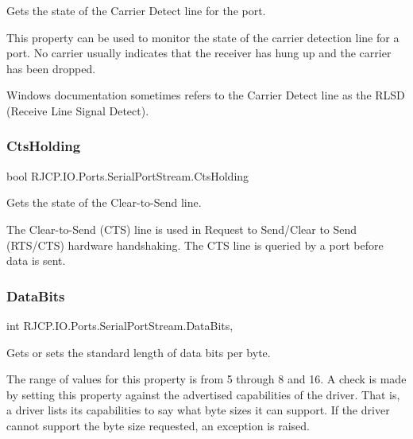Gets the state of the Carrier Detect line for the port. 

This property can be used to monitor the state of the carrier detection line for a port. No carrier usually indicates that the receiver has hung up and the carrier has been dropped. 

Windows documentation sometimes refers to the Carrier Detect line as the R\+L\+SD (Receive Line Signal Detect).\mbox{\label{class_r_j_c_p_1_1_i_o_1_1_ports_1_1_serial_port_stream_a63d7e47b92d9e4d2635c19f7025c8609}} 
\subsubsection{\texorpdfstring{CtsHolding}{CtsHolding}}
{\footnotesize\ttfamily bool R\+J\+C\+P.\+I\+O.\+Ports.\+Serial\+Port\+Stream.\+Cts\+Holding\hspace{0.3cm}{\ttfamily [get]}}



Gets the state of the Clear-\/to-\/\+Send line. 

The Clear-\/to-\/\+Send (C\+TS) line is used in Request to Send/\+Clear to Send (R\+T\+S/\+C\+TS) hardware handshaking. The C\+TS line is queried by a port before data is sent. \mbox{\label{class_r_j_c_p_1_1_i_o_1_1_ports_1_1_serial_port_stream_a75f62888fa2814a26c19ba59b87d1f96}} 
\subsubsection{\texorpdfstring{DataBits}{DataBits}}
{\footnotesize\ttfamily int R\+J\+C\+P.\+I\+O.\+Ports.\+Serial\+Port\+Stream.\+Data\+Bits\hspace{0.3cm}{\ttfamily [get]}, {\ttfamily [set]}}



Gets or sets the standard length of data bits per byte. 

The range of values for this property is from 5 through 8 and 16. A check is made by setting this property against the advertised capabilities of the driver. That is, a driver lists its capabilities to say what byte sizes it can support. If the driver cannot support the byte size requested, an exception is raised. 

